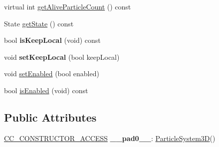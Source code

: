\begin{DoxyCompactItemize}
\item 
virtual int \hyperlink{classParticleSystem3D_aa7437bbc0845857deea675f0fb137314}{get\+Alive\+Particle\+Count} () const
\item 
State \hyperlink{classParticleSystem3D_a01944e27032c4afa6f115b69a0d359ed}{get\+State} () const
\item 
\mbox{\label{classParticleSystem3D_a87a2ac7688963232fd563e610dd558e9}} 
bool {\bfseries is\+Keep\+Local} (void) const
\item 
\mbox{\label{classParticleSystem3D_a7f346946b10068d5650efbada90d0083}} 
void {\bfseries set\+Keep\+Local} (bool keep\+Local)
\item 
void \hyperlink{classParticleSystem3D_a7e2e3536676b85183c6bb3e04e9f33ec}{set\+Enabled} (bool enabled)
\item 
bool \hyperlink{classParticleSystem3D_a1c9b24591395d002ca3fc953d2ce938e}{is\+Enabled} (void) const
\end{DoxyCompactItemize}
\subsection*{Public Attributes}
\begin{DoxyCompactItemize}
\item 
\mbox{\label{classParticleSystem3D_ac234f698c0696339c7c057e2050002c8}} 
\hyperlink{_2cocos2d_2cocos_2base_2ccConfig_8h_a25ef1314f97c35a2ed3d029b0ead6da0}{C\+C\+\_\+\+C\+O\+N\+S\+T\+R\+U\+C\+T\+O\+R\+\_\+\+A\+C\+C\+E\+SS} {\bfseries \+\_\+\+\_\+pad0\+\_\+\+\_\+}\+: \hyperlink{classParticleSystem3D}{Particle\+System3D}()
\end{DoxyCompactItemize}

